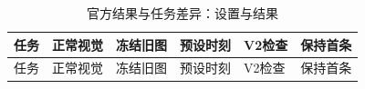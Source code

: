 \FloatBarrier\begingroup\small\setlength{\tabcolsep}{2.5pt}
\begin{longtable}[]{@{}
  >{\raggedright\arraybackslash}p{}
  >{\raggedright\arraybackslash}p{}
  >{\raggedright\arraybackslash}p{}
  >{\raggedright\arraybackslash}p{}
  >{\raggedright\arraybackslash}p{}
  >{\raggedright\arraybackslash}p{}@{}}
\caption{官方结果与任务差异：设置与结果}\label{tab:s12-5}\tabularnewline
\toprule\noalign{}
\begin{minipage}[b]{\linewidth}\raggedright
任务
\end{minipage} & \begin{minipage}[b]{\linewidth}\raggedright
正常视觉
\end{minipage} & \begin{minipage}[b]{\linewidth}\raggedright
冻结旧图
\end{minipage} & \begin{minipage}[b]{\linewidth}\raggedright
预设时刻
\end{minipage} & \begin{minipage}[b]{\linewidth}\raggedright
V2检查
\end{minipage} & \begin{minipage}[b]{\linewidth}\raggedright
保持首条
\end{minipage} \\
\midrule\noalign{}
\endfirsthead
\toprule\noalign{}
\begin{minipage}[b]{\linewidth}\raggedright
任务
\end{minipage} & \begin{minipage}[b]{\linewidth}\raggedright
正常视觉
\end{minipage} & \begin{minipage}[b]{\linewidth}\raggedright
冻结旧图
\end{minipage} & \begin{minipage}[b]{\linewidth}\raggedright
预设时刻
\end{minipage} & \begin{minipage}[b]{\linewidth}\raggedright
V2检查
\end{minipage} & \begin{minipage}[b]{\linewidth}\raggedright
保持首条
\end{minipage} \\

\end{longtable}
